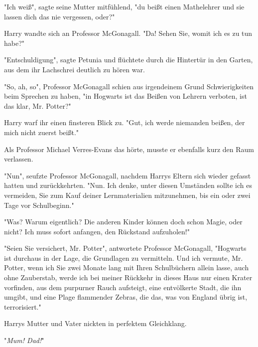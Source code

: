 "Ich weiß", sagte seine Mutter mitfühlend, "du beißt einen Mathelehrer und sie lassen dich das nie vergessen, oder?"

Harry wandte sich an Professor McGonagall. "Da! Sehen Sie, womit ich es zu tun habe?"

"Entschuldigung", sagte Petunia und flüchtete durch die Hintertür in den Garten, aus dem ihr Lachschrei deutlich zu hören war.

"So, ah, so", Professor McGonagall schien aus irgendeinem Grund Schwierigkeiten beim Sprechen zu haben, "in Hogwarts ist das Beißen von Lehrern verboten, ist das klar, Mr. Potter?"

Harry warf ihr einen finsteren Blick zu. "Gut, ich werde niemanden beißen, der mich nicht zuerst beißt."

Als Professor Michael Verres-Evans das hörte, musste er ebenfalls kurz den Raum verlassen.

"Nun", seufzte Professor McGonagall, nachdem Harrys Eltern sich wieder gefasst hatten und zurückkehrten. "Nun. Ich denke, unter diesen Umständen sollte ich es vermeiden, Sie zum Kauf deiner Lernmaterialien mitzunehmen, bis ein oder zwei Tage vor Schulbeginn."

"Was? Warum eigentlich? Die anderen Kinder können doch schon Magie, oder nicht? Ich muss sofort anfangen, den Rückstand aufzuholen!"

"Seien Sie versichert, Mr. Potter", antwortete Professor McGonagall, "Hogwarts ist durchaus in der Lage, die Grundlagen zu vermitteln. Und ich vermute, Mr. Potter, wenn ich Sie zwei Monate lang mit Ihren Schulbüchern allein lasse, auch ohne Zauberstab, werde ich bei meiner Rückkehr in dieses Haus nur einen Krater vorfinden, aus dem purpurner Rauch aufsteigt, eine entvölkerte Stadt, die ihn umgibt, und eine Plage flammender Zebras, die das, was von England übrig ist, terrorisiert."

Harrys Mutter und Vater nickten in perfektem Gleichklang.

"\emph{Mum! Dad!}"

